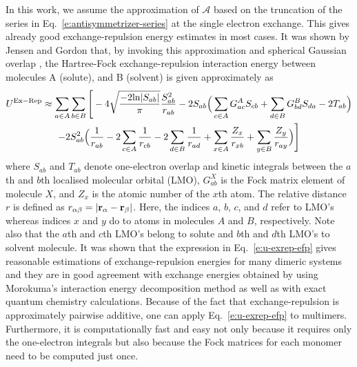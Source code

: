 \documentclass[a4paper,titlepage,twoside,fleqn,12pt]{book}
\begin{document}
\begin{refsection}
In this work, we assume the approximation of $\mathscr{A}$
based on the truncation of the series in Eq.~\eqref{e:antisymmetrizer-series}
at the single electron exchange. This gives already good exchange\hyp{}repulsion
energy estimates in most cases. It was shown by 
Jensen and Gordon \citep{Jensen.Gordon.JCP.1998,Jensen.Gordon.MolPhys.1996}
that, by invoking this
approximation and spherical Gaussian overlap \citep{Jensen.JCP.1996}, 
the Hartree\hyp{}Fock exchange\hyp{}repulsion interaction energy 
between molecules A (solute), and B (solvent) is given approximately as 
%
\begin{multline}\label{e:u-exrep-efp}
U^{\rm Ex-Rep} \approx \sum_{a \in A}\sum_{b \in B} \Bigg[
-4\sqrt{\frac{-2{\rm ln}|S_{ab}|}{\pi}} \frac{S_{ab}^2}{r_{ab}} 
-
2S_{ab} \Big( \sum_{c \in A} G^A_{ac} S_{cb} + 
\sum_{d \in B} G^B_{bd} S_{da} - 2 T_{ab} \Big) \\
-2S^2_{ab} \Big( \frac{1}{r_{ab}} 
- 2\sum_{c \in A} \frac{1}{r_{cb}} 
- 2\sum_{d \in B} \frac{1}{r_{ad}}
+ \sum_{x \in A} \frac{Z_x}{r_{xb}} 
+ \sum_{y \in B} \frac{Z_y}{r_{ay}}  
\Big)
\Bigg]
\end{multline}
%
where $S_{ab}$ and $T_{ab}$ denote one\hyp{}electron overlap and kinetic integrals 
between the $a$th and $b$th localised molecular orbital (LMO), 
$G^X_{ab}$ is the Fock matrix element of molecule 
$X$, and $Z_x$ is the atomic number of the $x$th atom. 
The relative distance $r$ is defined as $r_{\alpha\beta} = \left|{\bf r}_\alpha - {\bf r}_\beta \right|$. 
Here, the indices $a$, $b$, $c$, and $d$ refer to LMO's whereas indices $x$ and $y$ 
do to atoms in molecules $A$ and $B$, respectively. Note also that the $a$th 
and $c$th LMO's belong to solute and $b$th and $d$th LMO's to solvent molecule. 
It was shown \citep{Jensen.Gordon.JCP.1998,Jensen.Gordon.MolPhys.1996,Kemp.Rintelman.Gordon.Jensen.TheoretChemAcc.2009} 
that the expression in Eq.~\eqref{e:u-exrep-efp} gives reasonable 
estimations of exchange\hyp{}repulsion energies for many dimeric systems 
and they are in good agreement with exchange energies obtained 
by using Morokuma's interaction energy decomposition 
method \citep{Kitaura.Morokuma.IJQC.1976} 
as well as 
with exact quantum chemistry calculations. Because of the fact that 
exchange\hyp{}repulsion is approximately pairwise 
additive, \citep{Chen.Li.JPCA.2010,Chen.Gordon.JCP.1996,Jens.Bruske.Grimme.PCCP.2009,
Gora.Sokalski.Leszczynski.Pett.JPCB.2005,Chaudret.Gresh.Parisel.Piquemel.JCC.2011} 
one can 
apply Eq.~\eqref{e:u-exrep-efp} to multimers. Furthermore, it is computationally fast 
and easy not only because it requires only the one\hyp{}electron integrals 
but also because the Fock matrices for each monomer need to be computed just once.


\end{refsection}
\end{document}
